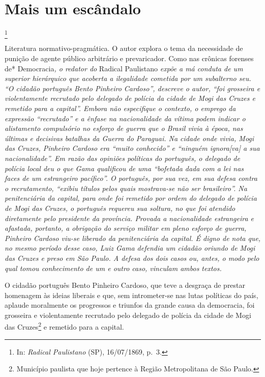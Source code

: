 \chapter{Mais um escândalo}\footnote{In: \emph{Radical Paulistano} (SP),
  16/07/1869, p.~3.}

\begin{didascalia}
Literatura normativo-pragmática. O autor explora o tema da necessidade
de punição de agente público arbitrário e prevaricador. Como nas
crônicas forenses de* Democracia\emph{, o redator do} Radical Paulistano
\emph{expõe a má conduta de um superior hierárquico que acoberta a
ilegalidade cometida por um subalterno seu. ``O cidadão português Bento
Pinheiro Cardoso'', descreve o autor, ``foi grosseira e violentamente
recrutado pelo delegado de polícia da cidade de Mogi das Cruzes e
remetido para a capital''. Embora não especifique o contexto, o emprego
da expressão ``recrutado'' e a ênfase na nacionalidade da vítima podem
indicar o alistamento compulsório no esforço de guerra que o Brasil
vivia à época, nas últimas e decisivas batalhas da Guerra do Paraguai.
Na cidade onde vivia, Mogi das Cruzes, Pinheiro Cardoso era ``muito
conhecido'' e ``ninguém ignora{[}va{]} a sua nacionalidade''. Em razão das
opiniões políticas do português, o delegado de polícia local deu o que
Gama qualificou de uma ``bofetada dada com a lei nas faces de um
estrangeiro pacífico''. O português, por sua vez, em sua defesa contra o
recrutamento, ``exibiu títulos pelos quais mostrava-se não ser
brasileiro''. Na penitenciária da capital, para onde foi remetido por
ordem do delegado de polícia de Mogi das Cruzes, o português requereu
sua soltura, no que foi atendido diretamente pelo presidente da
província. Provada a nacionalidade estrangeira e afastada, portanto, a
obrigação do serviço militar em pleno esforço de guerra, Pinheiro
Cardoso viu-se liberado da penitenciária da capital. É digno de nota
que, no mesmo período desse caso, Luiz Gama defendia um cidadão oriundo
de Mogi das Cruzes e preso em São Paulo. A defesa dos dois casos ou,
antes, o modo pelo qual tomou conhecimento de um e outro caso, vinculam
ambos textos.}
\end{didascalia}

\asterisc{}

O cidadão português Bento Pinheiro Cardoso, que teve a desgraça de
prestar homenagem às ideias liberais e que, sem intrometer-se nas lutas
políticas do país, aplaude moralmente os progressos e triunfos da grande
causa da democracia, foi grosseira e violentamente recrutado pelo
delegado de polícia da cidade de Mogi das Cruzes\footnote{Município
  paulista que hoje pertence à Região Metropolitana de São Paulo.} e
remetido para a capital.

